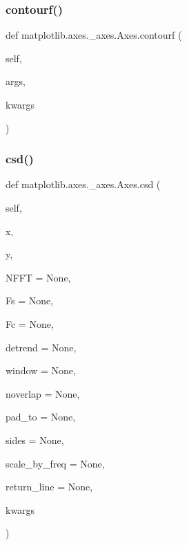 \subsubsection{\texorpdfstring{contourf()}{contourf()}}
{\footnotesize\ttfamily def matplotlib.\+axes.\+\_\+axes.\+Axes.\+contourf (\begin{DoxyParamCaption}\item[{}]{self,  }\item[{}]{args,  }\item[{}]{kwargs }\end{DoxyParamCaption})}

\mbox{\label{classmatplotlib_1_1axes_1_1__axes_1_1Axes_ab55663123c6eca78b463443e13ea1cc8}} 
\subsubsection{\texorpdfstring{csd()}{csd()}}
{\footnotesize\ttfamily def matplotlib.\+axes.\+\_\+axes.\+Axes.\+csd (\begin{DoxyParamCaption}\item[{}]{self,  }\item[{}]{x,  }\item[{}]{y,  }\item[{}]{N\+F\+FT = {\ttfamily None},  }\item[{}]{Fs = {\ttfamily None},  }\item[{}]{Fc = {\ttfamily None},  }\item[{}]{detrend = {\ttfamily None},  }\item[{}]{window = {\ttfamily None},  }\item[{}]{noverlap = {\ttfamily None},  }\item[{}]{pad\+\_\+to = {\ttfamily None},  }\item[{}]{sides = {\ttfamily None},  }\item[{}]{scale\+\_\+by\+\_\+freq = {\ttfamily None},  }\item[{}]{return\+\_\+line = {\ttfamily None},  }\item[{}]{kwargs }\end{DoxyParamCaption})}

